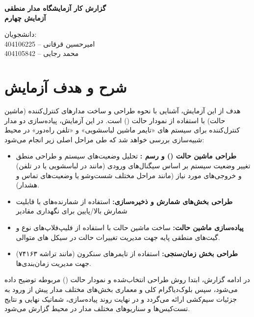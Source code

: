 \documentclass[12pt]{article}
\begin{document}
	
	\begin{center}
		\Large \textbf{گزارش کار آزمایشگاه مدار منطقی} \\[0.5em]
		\textbf{آزمایش چهارم}
	\end{center}
	
	\vspace{2em}
	
	\begin{center}
		دانشجویان:\\
		امیرحسین قرقانی -- 404106225\\
		محمد رجایی -- 404105842
	\end{center}
	
	
	\newpage
	
	\section{شرح و هدف آزمایش}
	
	هدف از این آزمایش، آشنایی با نحوه طراحی و ساخت مدارهای کنترل‌کننده (ماشین حالت) با استفاده از نمودار حالت () است. در این آزمایش، پیاده‌سازی دو مدار کنترل‌کننده برای سیستم های «تایمر ماشین لباسشویی» و «تلفن راه‌دور» در محیط شبیه‌سازی  بررسی خواهد شد که طی مراحل اصلی زیر انجام می‌شود:
	
	\begin{itemize}
		\item \textbf{طراحی ماشین حالت () و رسم :} تحلیل وضعیت‌های سیستم و طراحی منطق تغییر وضعیت سیستم بر اساس سیگنال‌های ورودی (مانند  در لباسشویی یا  در تلفن) و خروجی‌های مورد نیاز (مانند مراحل مختلف شست‌وشو یا وضعیت‌های تماس و هشدار).
		
		\item \textbf{طراحی بخش‌های شمارش و ذخیره‌سازی:} استفاده از شمارنده‌های  با قابلیت شمارش بالا/پایین برای نگهداری مقادیر
		
		\item \textbf{پیاده‌سازی ماشین حالت:} ساخت ماشین حالت با استفاده از فلیپ‌فلاپ‌های نوع  و گیت‌های منطقی پایه جهت مدیریت تغییرات حالت در سیکل های متوالی.
		
		\item \textbf{طراحی بخش زمان‌سنجی:} استفاده از تایمرهای سنکرون (مانند تراشه ۷۴۱۶۳) جهت مدیریت زمان‌بندی‌ها.
		
	\end{itemize}
	
	در ادامه گزارش، ابتدا روش طراحی انتخاب‌شده و نمودار حالت () مربوطه توضیح داده می‌شود، سپس بلوک‌دیاگرام کلی و معماری بخش‌های مختلف مدار پیش از ورود به جزئیات سیم‌کشی ارائه می‌گردد و در نهایت روند پیاده‌سازی، شماتیک نهایی و نتایج تست‌کیس‌ها و سناریوهای مختلف مدار در محیط  گزارش می‌شود.
	
\end{document}
